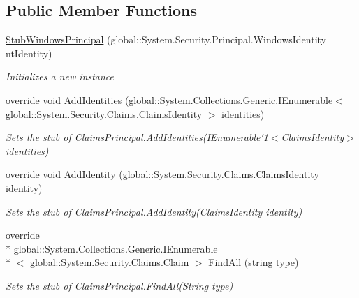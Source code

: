 \subsection*{Public Member Functions}
\begin{DoxyCompactItemize}
\item 
\hyperlink{class_system_1_1_security_1_1_principal_1_1_fakes_1_1_stub_windows_principal_ae5d71a75c92057cd6582a085a48c4d10}{Stub\-Windows\-Principal} (global\-::\-System.\-Security.\-Principal.\-Windows\-Identity nt\-Identity)
\begin{DoxyCompactList}\small\item\em Initializes a new instance\end{DoxyCompactList}\item 
override void \hyperlink{class_system_1_1_security_1_1_principal_1_1_fakes_1_1_stub_windows_principal_ace7a709f7d69ac4f47f8e89701a82c22}{Add\-Identities} (global\-::\-System.\-Collections.\-Generic.\-I\-Enumerable$<$ global\-::\-System.\-Security.\-Claims.\-Claims\-Identity $>$ identities)
\begin{DoxyCompactList}\small\item\em Sets the stub of Claims\-Principal.\-Add\-Identities(I\-Enumerable`1$<$Claims\-Identity$>$ identities)\end{DoxyCompactList}\item 
override void \hyperlink{class_system_1_1_security_1_1_principal_1_1_fakes_1_1_stub_windows_principal_a72041235ebeb8569bfa911c7f58e4aca}{Add\-Identity} (global\-::\-System.\-Security.\-Claims.\-Claims\-Identity identity)
\begin{DoxyCompactList}\small\item\em Sets the stub of Claims\-Principal.\-Add\-Identity(\-Claims\-Identity identity)\end{DoxyCompactList}\item 
override \\*
global\-::\-System.\-Collections.\-Generic.\-I\-Enumerable\\*
$<$ global\-::\-System.\-Security.\-Claims.\-Claim $>$ \hyperlink{class_system_1_1_security_1_1_principal_1_1_fakes_1_1_stub_windows_principal_a2f00944f1cdc2ba975100e059ca0bdcf}{Find\-All} (string \hyperlink{jquery-1_810_82-vsdoc_8js_a3940565e83a9bfd10d95ffd27536da91}{type})
\begin{DoxyCompactList}\small\item\em Sets the stub of Claims\-Principal.\-Find\-All(\-String type)\end{DoxyCompactList}\item 

\end{DoxyCompactItemize}
